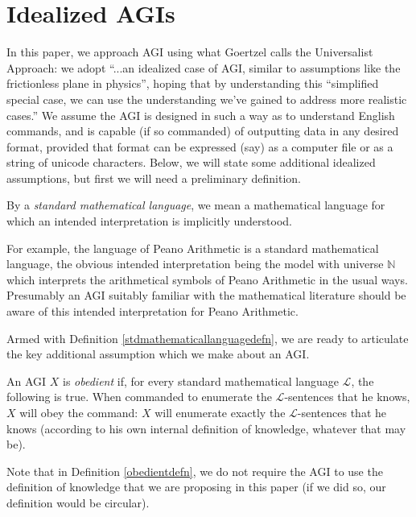 \documentclass[runningheads]{llncs}
\begin{document}
\section{Idealized AGIs}
\label{agisection}



In this paper, we approach AGI using what
Goertzel \cite{goertzel2014artificial} calls
the Universalist Approach:
we adopt ``...an idealized case of AGI, similar to
assumptions like the frictionless plane in physics'', hoping that by
understanding this ``simplified special
case, we can use the understanding we've gained to address more realistic
cases.'' We assume the AGI is designed in such a way as to understand
English commands, and is capable (if so commanded) of outputting data in
any desired format, provided that format can be expressed (say) as a computer
file or as a string of unicode characters. Below, we will state some additional
idealized assumptions, but first we will need a preliminary definition.

\begin{definition}
\label{stdmathematicallanguagedefn}
By a \emph{standard mathematical language}, we mean a mathematical language for which an
intended interpretation is implicitly understood.
\end{definition}

For example, the
language of Peano Arithmetic is a standard mathematical language, the obvious
intended interpretation being the model with universe $\mathbb N$ which
interprets the arithmetical symbols of Peano Arithmetic in the usual ways.
Presumably an AGI suitably familiar with the mathematical literature should
be aware of this intended interpretation for Peano Arithmetic.

Armed with Definition \ref{stdmathematicallanguagedefn}, we are ready to articulate
the key additional assumption which we make about an AGI.

\begin{definition}
\label{obedientdefn}
  An AGI $X$ is \emph{obedient} if, for every standard mathematical language
  $\mathscr L$, the following is true. When commanded to enumerate the
  $\mathscr L$-sentences that he knows, $X$ will obey the command:
  $X$ will enumerate exactly the $\mathscr L$-sentences that he knows
  (according to his own internal definition of knowledge,
  whatever that may be).
\end{definition}


Note that in Definition \ref{obedientdefn}, we do not require the AGI to use
the definition of knowledge that we are proposing in this paper (if we did so,
our definition would be circular).
\end{document}
